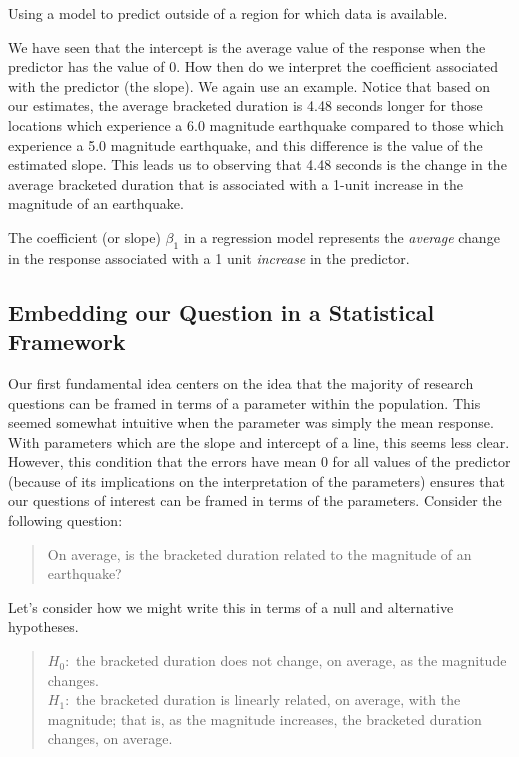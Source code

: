 \documentclass[]{book}
\theoremstyle{plain}
\theoremstyle{mydefn}
\theoremstyle{myexmpl}
\theoremstyle{remark}
\let\BeginKnitrBlock\begin \let\EndKnitrBlock\end
\let\BeginKnitrBlock\begin \let\EndKnitrBlock\end
\begin{document}
\BeginKnitrBlock{definition}[Extrapolation]
\protect\hypertarget{def:defn-extrapolation}{}{\label{def:defn-extrapolation}
{} }Using a model to predict outside of a
region for which data is available.
\EndKnitrBlock{definition}

We have seen that the intercept is the average value of the response
when the predictor has the value of 0. How then do we interpret the
coefficient associated with the predictor (the slope). We again use an
example. Notice that based on our estimates, the average bracketed
duration is 4.48 seconds longer for those locations which experience a
6.0 magnitude earthquake compared to those which experience a 5.0
magnitude earthquake, and this difference is the value of the estimated
slope. This leads us to observing that 4.48 seconds is the change in the
average bracketed duration that is associated with a 1-unit increase in
the magnitude of an earthquake.

\BeginKnitrBlock{rmdtip}
The coefficient (or slope) \(\beta_1\) in a regression model represents
the \emph{average} change in the response associated with a 1 unit
\emph{increase} in the predictor.
\EndKnitrBlock{rmdtip}

\subsection{Embedding our Question in a Statistical
Framework}\label{embedding-our-question-in-a-statistical-framework}

Our first fundamental idea centers on the idea that the majority of
research questions can be framed in terms of a parameter within the
population. This seemed somewhat intuitive when the parameter was simply
the mean response. With parameters which are the slope and intercept of
a line, this seems less clear. However, this condition that the errors
have mean 0 for all values of the predictor (because of its implications
on the interpretation of the parameters) ensures that our questions of
interest can be framed in terms of the parameters. Consider the
following question:

\begin{quote}
On average, is the bracketed duration related to the magnitude of an
earthquake?
\end{quote}

Let's consider how we might write this in terms of a null and
alternative hypotheses.

\begin{quote}
\(H_0:\) the bracketed duration does not change, on average, as the
magnitude changes.\\
\(H_1:\) the bracketed duration is linearly related, on average, with
the magnitude; that is, as the magnitude increases, the bracketed
duration changes, on average.
\end{quote}
\end{document}
